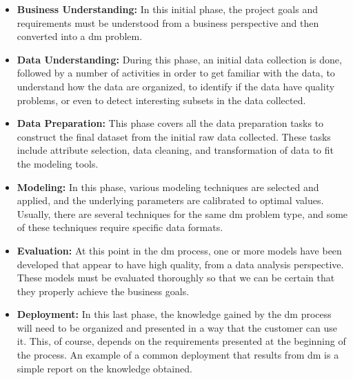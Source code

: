\begin{itemize}

    \item\textbf{Business Understanding:} In this initial phase, the project goals and requirements must be understood from a business perspective and then converted into a \ac{dm} problem.

    \item\textbf{Data Understanding:} During this phase, an initial data collection is done, followed by a number of activities in order to get familiar with the data, to understand how the data are organized, to identify if the data have quality problems, or even to detect interesting subsets in the data collected.

    \item\textbf{Data Preparation:} This phase covers all the data preparation tasks to construct the final dataset from the initial raw data collected. These tasks include attribute selection, data cleaning, and transformation of data to fit the modeling tools.

    \item\textbf{Modeling:} In this phase, various modeling techniques are selected and applied, and the underlying parameters are calibrated to optimal values. Usually, there are several techniques for the same \ac{dm} problem type, and some of these techniques require specific data formats.

    \item\textbf{Evaluation:} At this point in the \ac{dm} process, one or more models have been developed that appear to have high quality, from a data analysis perspective. These models must be evaluated thoroughly so that we can be certain that they properly achieve the business goals.

    \item\textbf{Deployment:} In this last phase, the knowledge gained by the \ac{dm} process will need to be organized and presented in a way that the customer can use it. This, of course, depends on the requirements presented at the beginning of the process. An example of a common deployment that results from \ac{dm} is a simple report on the knowledge obtained. 

\end{itemize}

